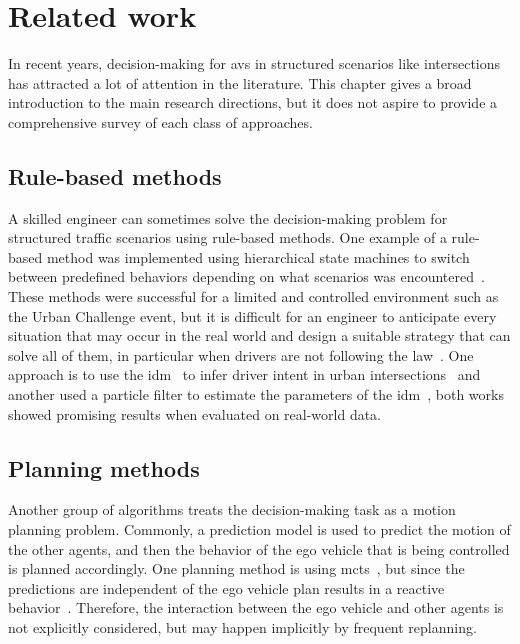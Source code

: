 \chapter{Related work}\label{ch:related_work}

In recent years, decision-making for \gls{av}s in structured scenarios like intersections has attracted a lot of attention in the literature. This chapter gives a broad introduction to the main research directions, but it does not aspire to provide a comprehensive survey of each class of approaches.

\section{Rule-based methods}
A skilled engineer can sometimes solve the decision-making problem for structured traffic scenarios using rule-based methods. One example of a rule-based method was implemented using hierarchical state machines to switch between predefined behaviors depending on what scenarios was encountered~\cite{Fletcher2008, darpa2008}. These methods were successful for a limited and controlled environment such as the Urban Challenge event, but it is difficult for an engineer to anticipate every situation that may occur in the real world and design a suitable strategy that can solve all of them, in particular when drivers are not following the law~\cite{Althoff2021}. 
One approach is to use the \gls{idm}~\cite{idm2000} to infer driver intent in urban intersections~\cite{Liebner2012} and another used a particle filter to estimate the parameters of the \gls{idm}~\cite{Hoermann2017}, both works showed promising results when evaluated on real-world data. 


\section{Planning methods}
Another group of algorithms treats the decision-making task as a motion planning problem. Commonly, a prediction model is used to predict the motion of the other agents, and then the behavior of the ego vehicle that is being controlled is planned accordingly. One planning method is using \gls{mcts}~\cite{Browne2012}, but since the predictions are independent of the ego vehicle plan results in a reactive behavior~\cite{Hubmann2017, Sunberg2017}. Therefore, the interaction between the ego vehicle and other agents is not explicitly considered, but may happen implicitly by frequent replanning. %

